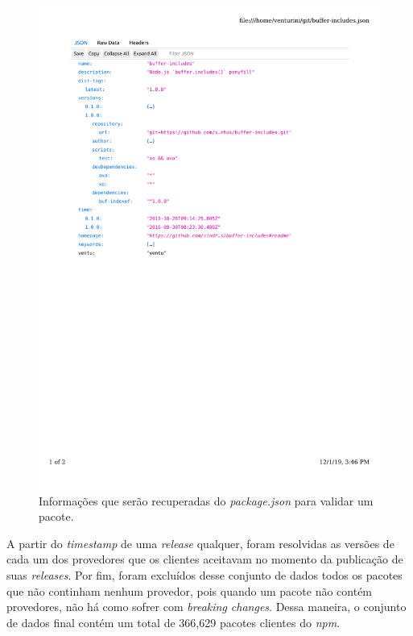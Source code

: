 \begin{figure}
    \centering
    \includegraphics[scale=0.65]{figuras/package_json.pdf}
    \caption{Informações que serão recuperadas do \textit{package.json} para validar um pacote.}
    \label{fig:package_json}
\end{figure}{}

A partir do \textit{timestamp} de uma \textit{release} qualquer, foram resolvidas as versões de cada um dos provedores que os clientes aceitavam no momento da publicação de suas \textit{releases}. Por fim, foram excluídos desse conjunto de dados todos os pacotes que não continham nenhum provedor, pois quando um pacote não contém provedores, não há como sofrer com \textit{breaking changes}. Dessa maneira, o conjunto de dados final contém um total de 366,629 pacotes clientes do \textit{npm}.

